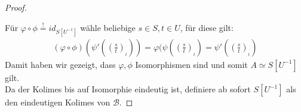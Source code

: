 \documentclass[10pt,a4paper]{report}
\newcommand{\lok}[2]{#1 [#2^{-1}]}
\newcommand{\loke}[3]{(\frac{#1}{#2})_{_{#3}}}
\newcommand*{\defshow}{\stackrel{!}{=}}
\begin{document}
\begin{proof}
\begin{center}
\end{center}
Für $\varphi \circ \phi \defshow id_{\lok{S}{U}}$ wähle beliebige $s \in S , t \in U$, für diese gilt:
\begin{gather*}
(\varphi \circ \phi)(\psi'(\loke{s}{t}{t})) =
 \varphi (\psi(\loke{s}{t}{t}) =
  \psi'(\loke{s}{t}{t})
\end{gather*}
Damit haben wir gezeigt, dass $\varphi,\phi$ Isomorphismen sind und somit $A \simeq \lok{S}{U}$ gilt.\\
Da der Kolimes bis auf Isomorphie eindeutig ist, definiere ab sofort $\lok{S}{U}$ als den eindeutigen Kolimes von $\mathcal{B}$.\end{proof}
\end{document}
